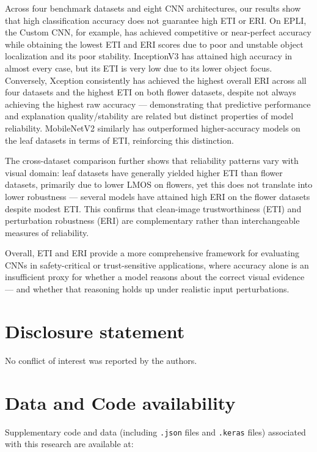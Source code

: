 \documentclass[a4paper,fleqn]{cas-dc}
\begin{document}
Across four benchmark datasets and eight CNN architectures, our results show that high classification accuracy does not guarantee high ETI or ERI. On EPLI, the Custom CNN, for example, has achieved competitive or near-perfect accuracy while obtaining the lowest ETI and ERI scores due to poor and unstable object localization and its poor stability. InceptionV3 has attained high accuracy in almost every case, but its ETI is very low due to its lower object focus. Conversely, Xception consistently has achieved the highest overall ERI across all four datasets and the highest ETI on both flower datasets, despite not always achieving the highest raw accuracy — demonstrating that predictive performance and explanation quality/stability are related but distinct properties of model reliability. MobileNetV2 similarly has outperformed higher-accuracy models on the leaf datasets in terms of ETI, reinforcing this distinction.

The cross-dataset comparison further shows that reliability patterns vary with visual domain: leaf datasets have generally yielded higher ETI than flower datasets, primarily due to lower LMOS on flowers, yet this does not translate into lower robustness — several models have attained high ERI on the flower datasets despite modest ETI. This confirms that clean-image trustworthiness (ETI) and perturbation robustness (ERI) are complementary rather than interchangeable measures of reliability.

Overall, ETI and ERI provide a more comprehensive framework for evaluating CNNs in safety-critical or trust-sensitive applications, where accuracy alone is an insufficient proxy for whether a model reasons about the correct visual evidence — and whether that reasoning holds up under realistic input perturbations.


\printcredits

\section*{Disclosure statement}
No conflict of interest was reported by the authors.

\section*{Data and Code availability}

Supplementary code and data (including \texttt{.json} files and
\texttt{.keras} files) associated with this research are available at:
\end{document}
